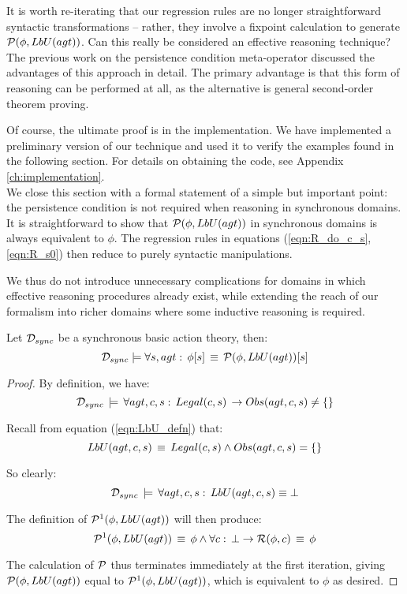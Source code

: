 It is worth re-iterating that our regression rules are no longer straightforward
syntactic transformations -- rather, they involve a fixpoint calculation
to generate $\mathcal{P}(\phi,LbU(agt))$. Can this really be considered
an effective reasoning technique? The previous work on the persistence
condition meta-operator discussed the advantages of this approach
in detail. The primary advantage is that this form of reasoning can
be performed at all, as the alternative is general second-order theorem
proving.

Of course, the ultimate proof is in the implementation. We have implemented
a preliminary version of our technique and used it to verify the examples
found in the following section. For details on obtaining the code,
see Appendix \ref{ch:implementation}.\\


We close this section with a formal statement of a simple but important
point: the persistence condition is not required when reasoning in
synchronous domains. It is straightforward to show that $\mathcal{P}(\phi,LbU(agt))$
in synchronous domains is always equivalent to $\phi$. The regression
rules in equations (\ref{eqn:R_do_c_s},\ref{eqn:R_s0}) then reduce
to purely syntactic manipulations.

We thus do not introduce unnecessary complications for domains in
which effective reasoning procedures already exist, while extending
the reach of our formalism into richer domains where some inductive
reasoning is required. 
\begin{thm}
Let $\mathcal{D}_{sync}$ be a synchronous basic action theory, then:\[
\mathcal{D}_{sync}\models\forall s,agt:\,\phi[s]\,\equiv\,\mathcal{P}(\phi,LbU(agt))[s]\]
 \end{thm}
\begin{proof}
By definition, we have:\[
\mathcal{D}_{sync}\,\models\,\forall agt,c,s:\, Legal(c,s)\,\rightarrow Obs(agt,c,s)\neq\{\}\]


Recall from equation (\ref{eqn:LbU_defn}) that:\[
LbU(agt,c,s)\,\equiv\, Legal(c,s)\wedge Obs(agt,c,s)=\{\}\]


So clearly:\[
\mathcal{D}_{sync}\,\models\,\forall agt,c,s:\,LbU(agt,c,s)\equiv\bot\]


The definition of $\mathcal{P}^{1}(\phi,LbU(agt))$ will then produce:\[
\mathcal{P}^{1}(\phi,LbU(agt))\,\equiv\,\phi\wedge\forall c:\,\bot\rightarrow\mathcal{R}(\phi,c)\,\equiv\,\phi\]


The calculation of $\mathcal{P}$ thus terminates immediately at the first
iteration, giving $\mathcal{P}(\phi,LbU(agt))$ equal to $\mathcal{P}^{1}(\phi,LbU(agt))$,
which is equivalent to $\phi$ as desired. 
\end{proof}

